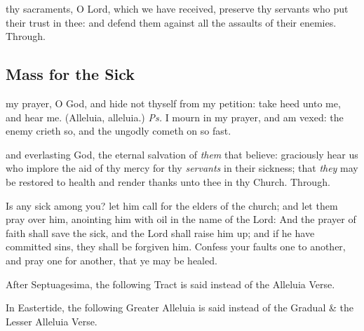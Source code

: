 
\postcommunion
{} thy sacraments, O Lord, which we have received, preserve thy servants who put their trust in thee: and defend them against all the assaults of their enemies. Through.


\subsection{Mass for the Sick}

\introit
{} my prayer, O God, and hide not thyself from my petition: take heed unto me, and hear me. (Alleluia, alleluia.) \textit{Ps.} I mourn in my prayer, and am vexed: the enemy crieth so, and the ungodly cometh on so fast.

\collect
{} and everlasting God, the eternal salvation of \emph{them} that believe: graciously hear us who implore the aid of thy mercy for thy \emph{servants} in their sickness; that \emph{they} may be restored to health and render thanks unto thee in thy Church. Through.

 Is any sick among you? let him call for the elders of the church; and let them pray over him, anointing him with oil in the name of the Lord: And the prayer of faith shall save the sick, and the Lord shall raise him up; and if he have committed sins, they shall be forgiven him. Confess your faults one to another, and pray one for another, that ye may be healed.


\begin{rubric}
    After Septuagesima, the following Tract is said instead of the Alleluia Verse.
\end{rubric}


\begin{rubric}
    In Eastertide, the following Greater Alleluia is said instead of the Gradual \& the Lesser Alleluia Verse.
\end{rubric}

